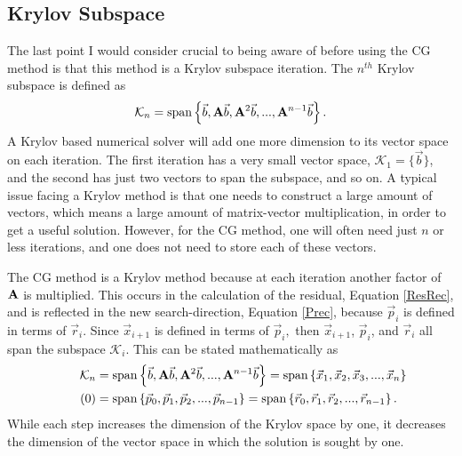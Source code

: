 \documentclass[11pt,letterpaper,oneside,notitlepage]{article}	%
\newcommand{\bfa}{{\bf A}}						%
\newcommand{\yestag}{\tag{\theequation}\stepcounter{equation}}	%
\newcommand{\eq}[1]{Equation \eqref{#1}}		%
\newcommand{\pindent}[1]{\hspace{6mm}}  		%
\numberwithin{equation}{section}				%
\begin{document}
\subsection{Krylov Subspace}%
\pindent{}The last point I would consider crucial to being aware of before using the CG method is that this method is a Krylov subspace iteration. The $n^{th}$ Krylov subspace is defined as
\begin{equation}
\mathcal{K}_n = \text{span}\left\{\vec b,\bfa \vec b,\bfa^2 \vec b, ... , \bfa^{n-1}\vec b \right\}
.\end{equation}
A Krylov based numerical solver will add one more dimension to its vector space on each iteration. The first iteration has a very small vector space, $\mathcal{K}_1=\{\vec b\}$, and the second has just two vectors to span the subspace, and so on. A typical issue facing a Krylov method is that one needs to construct a large amount of vectors, which means a large amount of matrix-vector multiplication, in order to get a useful solution. However, for the CG method, one will often need just $n$ or less iterations, and one does not need to store each of these vectors.

The CG method is a Krylov method because at each iteration another factor of $\bfa$ is multiplied. This occurs in the calculation of the residual, \eq{ResRec}, and is reflected in the new search-direction, \eq{Prec}, because $\vec p_i$ is defined in terms of $\vec r_i$. Since $\vec x_{i+1}$ is defined in terms of $\vec p_i,$ then $\vec x_{i+1}$, $\vec p_i$, and $\vec r_i$ all span the subspace $\mathcal{K}_i$\cite{Trefethen97}. This can be stated mathematically as
\begin{align*}
\mathcal{K}_n &= \text{span}\left\{\vec b,\bfa \vec b,\bfa^2 \vec b, ... , \bfa^{n-1}\vec b \right\} = \text{span}\left\{\vec x_1, \vec x_2,\vec x_3, ..., \vec x_n \right\}\\ \yestag \label{Krylov}
&= \text{span}\left\{\vec p_0,\vec p_1,\vec p_2,...,\vec p_{n-1}\right\}=\text{span}\left\{\vec r_0,\vec r_1, \vec r_2, ...,\vec r_{n-1}\right\}
.\end{align*}
While each step increases the dimension of the Krylov space by one, it decreases the dimension of the vector space in which the solution is sought by one\cite{CG1952}.

\end{document}
